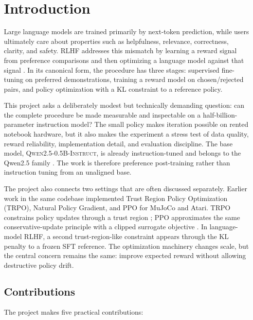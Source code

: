 \documentclass[11pt]{article}
\newcommand{\model}{\textsc{Qwen2.5-0.5B-Instruct}}
\begin{document}
\tableofcontents
\newpage

\section{Introduction}

Large language models are trained primarily by next-token prediction, while
users ultimately care about properties such as helpfulness, relevance,
correctness, clarity, and safety. RLHF addresses this mismatch by learning a
reward signal from preference comparisons and then optimizing a language model
against that signal \cite{christiano2017,stiennon2020,ouyang2022}. In its
canonical form, the procedure has three stages: supervised fine-tuning on
preferred demonstrations, training a reward model on chosen/rejected pairs,
and policy optimization with a KL constraint to a reference policy.

This project asks a deliberately modest but technically demanding question:
can the complete procedure be made measurable and inspectable on a
half-billion-parameter instruction model? The small policy makes iteration
possible on rented notebook hardware, but it also makes the experiment a
stress test of data quality, reward reliability, implementation detail, and
evaluation discipline. The base model, \model{}, is already instruction-tuned
and belongs to the Qwen2.5 family \cite{qwen25}. The work is therefore
preference post-training rather than instruction tuning from an unaligned base.

The project also connects two settings that are often discussed separately.
Earlier work in the same codebase implemented Trust Region Policy Optimization
(TRPO), Natural Policy Gradient, and PPO for MuJoCo and Atari. TRPO constrains
policy updates through a trust region \cite{schulman2015}; PPO approximates the
same conservative-update principle with a clipped surrogate objective
\cite{schulman2017}. In language-model RLHF, a second trust-region-like
constraint appears through the KL penalty to a frozen SFT reference. The
optimization machinery changes scale, but the central concern remains the
same: improve expected reward without allowing destructive policy drift.

\subsection{Contributions}

The project makes five practical contributions:
\end{document}
